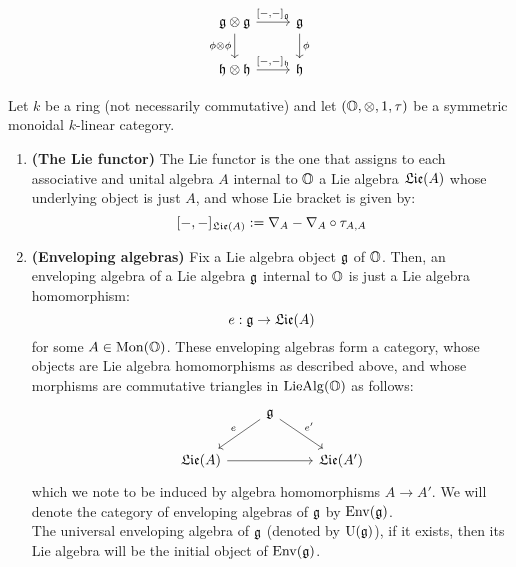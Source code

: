 \begin{definition}
                        $$
                            \begin{tikzcd}
                            	{\g \tensor \g} & {\g} \\
                            	{\h \tensor \h} & {\h}
                            	\arrow["{\phi}", from=1-2, to=2-2]
                            	\arrow["{\phi \tensor \phi}"', from=1-1, to=2-1]
                            	\arrow["{[-,-]_{\h}}", from=2-1, to=2-2]
                            	\arrow["{[-,-]_{\g}}", from=1-1, to=1-2]
                            \end{tikzcd}
                        $$
                \end{definition}
                
                \begin{definition} \label{def: enveloping_algebras}
                    Let $k$ be a ring (not necessarily commutative) and let $(\O, \tensor, 1, \tau)$ be a symmetric monoidal $k$-linear category.
                        \begin{enumerate}
                            \item \textbf{(The Lie functor)} The Lie functor is the one that assigns to each associative and unital algebra $A$ internal to $\mathbb{O}$ a Lie algebra $\mathfrak{Lie}(A)$ whose underlying object is just $A$, and whose Lie bracket is given by:
                                $$[-,-]_{\mathfrak{Lie}(A)} := \nabla_A - \nabla_A \circ \tau_{A,A}$$
                            \item \textbf{(Enveloping algebras)} Fix a Lie algebra object $\mathfrak{g}$ of $\mathbb{O}$. Then, an enveloping algebra of a Lie algebra $\mathfrak{g}$ internal to $\mathbb{O}$ is just a Lie algebra homomorphism:
                                $$e: \mathfrak{g} \to \mathfrak{Lie}(A)$$
                            for some $A \in \mathrm{Mon}(\mathbb{O})$. These enveloping algebras form a category, whose objects are Lie algebra homomorphisms as described above, and whose morphisms are commutative triangles in $\mathrm{Lie}\mathrm{Alg}(\mathbb{O})$ as follows:
                                $$
                                    \begin{tikzcd}
                                    	& {\g} \\
                                    	{\frakLie(A)} && {\frakLie(A')}
                                    	\arrow[from=2-1, to=2-3]
                                    	\arrow["{e}"', from=1-2, to=2-1]
                                    	\arrow["{e'}", from=1-2, to=2-3]
                                    \end{tikzcd}
                                $$
                            which we note to be induced by algebra homomorphisms $A \to A'$. We will denote the category of enveloping algebras of $\mathfrak{g}$ by $\mathrm{Env}(\mathfrak{g})$. 
                            \\
                            The universal enveloping algebra of $\mathfrak{g}$ (denoted by $\mathrm{U}(\mathfrak{g})$), if it exists, then its Lie algebra will be the initial object of $\mathrm{Env}(\mathfrak{g})$. 
                        \end{enumerate}
                \end{definition}
                

